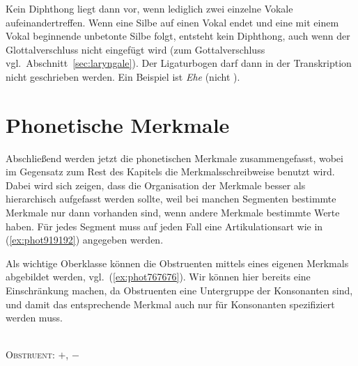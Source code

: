 Kein Diphthong liegt dann vor, wenn lediglich zwei einzelne Vokale aufeinandertreffen.
Wenn eine Silbe auf einen Vokal endet und eine mit einem Vokal beginnende unbetonte Silbe folgt, entsteht kein Diphthong, auch wenn der Glottalverschluss nicht eingefügt wird (zum Gottalverschluss vgl.\ Abschnitt~\ref{sec:laryngale}).
Der Ligaturbogen darf dann in der Transkription nicht geschrieben werden.
Ein Beispiel ist \textit{Ehe} \textipa{[Pe:@]} (nicht \Ast\textipa{[P\t{e@}]}).




\section{Phonetische Merkmale}

\label{sec:phonetischemerkmale}

Abschließend werden jetzt die phonetischen Merkmale zusammengefasst, wobei im Gegensatz zum Rest des Kapitels die Merkmalsschreibweise benutzt wird.
Dabei wird sich zeigen, dass die Organisation der Merkmale besser als hierarchisch aufgefasst werden sollte, weil bei manchen Segmenten bestimmte Merkmale nur dann vorhanden sind, wenn andere Merkmale bestimmte Werte haben.
Für jedes Segment muss auf jeden Fall eine Artikulationsart wie in (\ref{ex:phot919192}) angegeben werden.

\begin{exe}
\end{exe}

Als wichtige Oberklasse können die Obstruenten mittels eines eigenen Merkmals abgebildet werden, vgl.\ (\ref{ex:phot767676}).
Wir können hier bereits eine Einschränkung machen, da Obstruenten eine Untergruppe der Konsonanten sind, und damit das entsprechende Merkmal auch nur für Konsonanten spezifiziert werden muss.

\begin{exe}
	\\
		\textsc{Obstruent}: $+$, $-$
\end{exe}


